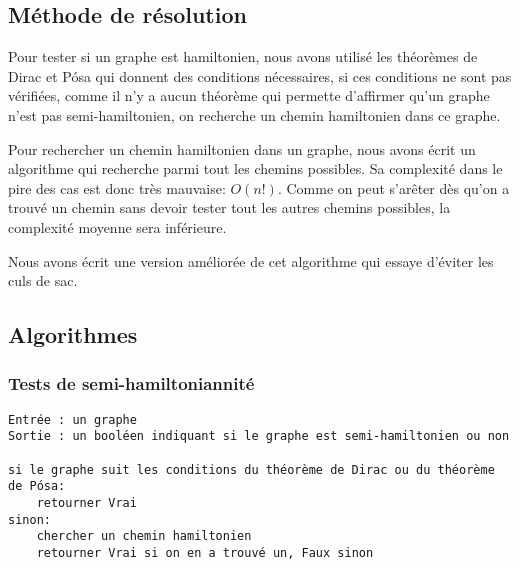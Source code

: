 \documentclass{scrartcl}
\begin{document}
  \subsection{Méthode de résolution}
    Pour tester si un graphe est hamiltonien, nous avons utilisé les théorèmes
    de Dirac et Pósa qui donnent des conditions nécessaires, si ces conditions
    ne sont pas vérifiées, comme il n'y a aucun théorème qui permette
    d'affirmer qu'un graphe n'est pas semi-hamiltonien, on recherche un chemin
    hamiltonien dans ce graphe.

    Pour rechercher un chemin hamiltonien dans un graphe, nous avons écrit un
    algorithme qui recherche parmi tout les chemins possibles. Sa complexité
    dans le pire des cas est donc très mauvaise: $O(n!)$. Comme on peut
    s'arêter dès qu'on a trouvé un chemin sans devoir tester tout les autres
    chemins possibles, la complexité moyenne sera inférieure.

    Nous avons écrit une version améliorée de cet algorithme qui essaye
    d'éviter les culs de sac.

  \subsection{Algorithmes}
    \subsubsection{Tests de semi-hamiltoniannité}
      \begin{lstlisting}
Entrée : un graphe
Sortie : un booléen indiquant si le graphe est semi-hamiltonien ou non

si le graphe suit les conditions du théorème de Dirac ou du théorème de Pósa:
    retourner Vrai
sinon:
    chercher un chemin hamiltonien
    retourner Vrai si on en a trouvé un, Faux sinon
      \end{lstlisting}
\end{document}
